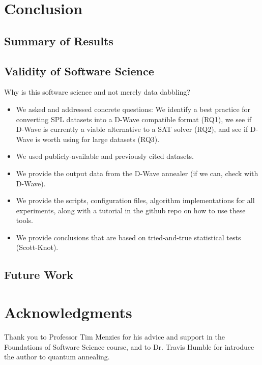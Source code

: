\documentclass{sig-alternate-05-2015}
\begin{document}
\section{Conclusion}

\subsection{Summary of Results}

\subsection{Validity of Software Science}
Why is this software science and not merely data dabbling?
\begin{itemize}
\item We asked and addressed concrete questions: We identify a best practice for converting SPL datasets into a D-Wave compatible format (RQ1), we see if D-Wave is currently a viable alternative to a SAT solver (RQ2), and see if D-Wave is worth using for large datasets (RQ3).
\item We used publicly-available and previously cited datasets.
\item We provide the output data from the D-Wave annealer (if we can, check with D-Wave).
\item We provide the scripts, configuration files, algorithm implementations for all experiments, along with a tutorial in the github repo on how to use these tools.
\item We provide conclusions that are based on tried-and-true statistical tests (Scott-Knot).
\end{itemize}

\subsection{Future Work}



\section{Acknowledgments}
Thank you to Professor Tim Menzies for his advice and support in the Foundations of Software Science course, and to Dr. Travis Humble for introduce the author to quantum annealing.

\newpage

\end{document}

